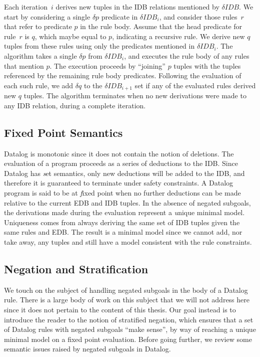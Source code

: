 Each iteration~$i$ derives new tuples in the IDB relations mentioned by $\delta
IDB$.  We start by considering a single $\delta p$ predicate in $\delta
IDB_{i}$, and consider those rules~$r$ that refer to predicate $p$ in the rule
body.  Assume that the head predicate for rule~$r$ is $q$, which maybe equal to
$p$, indicating a recursive rule.  We derive new $q$ tuples from these rules
using only the predicates mentioned in $\delta IDB_i$.  The algorithm takes a
single $\delta p$ from $\delta IDB_i$, and executes the rule body of any rules
that mention $p$.  The execution proceeds by ``joining'' $p$ tuples with the
tuples referenced by the remaining rule body predicates.  Following the
evaluation of each such rule, we add $\delta q$ to the $\delta IDB_{i+1}$ set
if any of the evaluated rules derived new $q$ tuples.  The algorithm terminates
when no new derivations were made to any IDB relation, during a complete
iteration.

\subsection{Fixed Point Semantics}

Datalog is monotonic since it does not contain the notion of deletions.  The
evaluation of a program proceeds as a series of deductions to the IDB.  Since
Datalog has {\emph set semantics}, only new deductions will be added to the
IDB, and therefore it is guaranteed to terminate under safety constraints.  A
Datalog program is said to be at {\emph fixed point} when no further deductions
can be made relative to the current EDB and IDB tuples.  In the absence of
negated subgoals, the derivations made during the evaluation represent a {\emph
unique minimal model}.  Uniqueness comes from always deriving the same set of
IDB tuples given the same rules and EDB.  The result is a minimal model since
we cannot add, nor take away, any tuples and still have a model consistent with
the rule constraints.

\subsection{Negation and Stratification}

We touch on the subject of handling negated subgoals in the body of a Datalog
rule.  There is a large body of work on this subject that we will not address
here since it does not pertain to the content of this thesis.  Our goal instead
is to introduce the reader to the notion of stratified negation, which ensures
that a set of Datalog rules with negated subgoals ``make sense'', by way of
reaching a unique minimal model on a fixed point evaluation.  Before going
further, we review some semantic issues raised by negated subgoals in Datalog.

